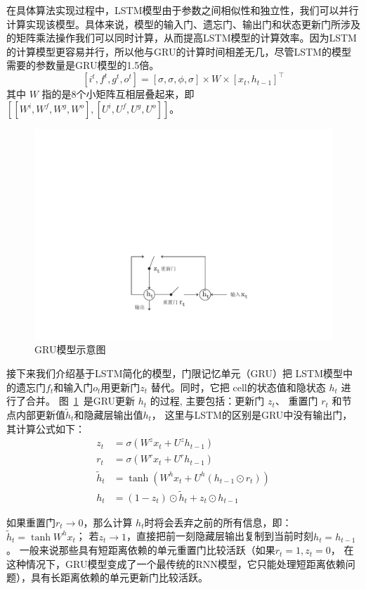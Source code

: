 在具体算法实现过程中，LSTM模型由于参数之间相似性和独立性，我们可以并行计算实现该模型。具体来说，模型的输入门、遗忘门、输出门和状态更新门所涉及的矩阵乘法操作我们可以同时计算，从而提高LSTM模型的计算效率。因为LSTM的计算模型更容易并行，所以他与GRU的计算时间相差无几，尽管LSTM的模型需要的参数量是GRU模型的1.5倍。
\begin{equation}\label{equ:weight}
[i^t,f^t,g^t,o^t ]=[\sigma, \sigma,\phi,\sigma]\times W\times[x_t,h_{t-1}]^\top
\end{equation}
其中 $W$ 指的是8个小矩阵互相层叠起来，即 $[[W^i,W^f,W^g,W^o],[U^i,U^f,U^g,U^o]]$。


\begin{figure}[!b]
  \centering
  \includegraphics[width=0.6\linewidth]{./figures/gru.pdf}
  \caption{GRU模型示意图}\label{fig:gru}
\end{figure}

接下来我们介绍基于LSTM简化的模型，门限记忆单元（GRU）把 LSTM模型中的遗忘门$f_t$和输入门$o_t$用更新门$z_t$ 替代。同时，它把 cell的状态值和隐状态 $h_t$ 进行了合并。 图~\ref{fig:gru}~是GRU更新 $h_t$ 的过程, 主要包括：更新门 $z_t$、 重置门 $r_t$ 和节点内部更新值$\tilde h_t$和隐藏层输出值$h_t$， 这里与LSTM的区别是GRU中没有输出门，其计算公式如下：
\begin{equation}\label{equ:gru}
\begin{split}
   z_t &= \sigma ( W^z x_t+ U^z h_{t-1}) \\
   r_t &= \sigma(W^r x_t  + U^r h_{t-1}  )\\
   \tilde h_t  &= \tanh (W^h x_t  + U^h(h_{t-1} \odot r_t) ) \\
   h_t &= (1-z_t)\odot \tilde h_t  + z_t \odot h_{t-1}
\end{split}
\end{equation}

如果重置门$r_t \to 0$，那么计算 $h_t$时将会丢弃之前的所有信息，即：$\tilde h_t=\tanh W^h x_t$； 若$z_t\to 1$，直接把前一刻隐藏层输出复制到当前时刻$ h_t =h_{t-1}$。 一般来说那些具有短距离依赖的单元重置门比较活跃（如果$r_t=1,z_t=0$， 在这种情况下，GRU模型变成了一个最传统的RNN模型，它只能处理短距离依赖问题），具有长距离依赖的单元更新门比较活跃。



